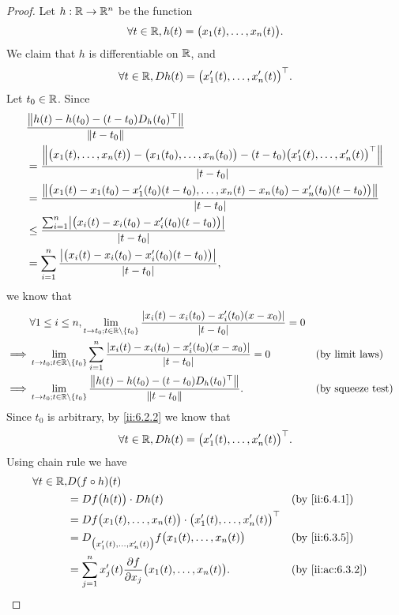 \begin{proof}
  Let \(h : \R \to \R^n\) be the function
  \[
    \forall t \in \R, h(t) = \big(x_1(t), \dots, x_n(t)\big).
  \]
  We claim that \(h\) is differentiable on \(\R\), and
  \[
    \forall t \in \R, D h(t) = \big(x_1'(t), \dots, x_n'(t)\big)^\top.
  \]
  Let \(t_0 \in \R\).
  Since
  \begin{align*}
     & \dfrac{\norm*{h(t) - h(t_0) - (t - t_0) D_h(t_0)^\top}}{\norm*{t - t_0}}                                                                                  \\
     & = \dfrac{\norm*{\big(x_1(t), \dots, x_n(t)\big) - \big(x_1(t_0), \dots, x_n(t_0)\big) - (t - t_0) \big(x_1'(t), \dots, x_n'(t)\big)^\top}}{\abs{t - t_0}} \\
     & = \dfrac{\norm*{\big(x_1(t) - x_1(t_0) - x_1'(t_0)(t - t_0), \dots, x_n(t) - x_n(t_0) - x_n'(t_0)(t - t_0)\big)}}{\abs{t - t_0}}                          \\
     & \leq \dfrac{\sum_{i = 1}^n \abs{\big(x_i(t) - x_i(t_0) - x_i'(t_0)(t - t_0)\big)}}{\abs{t - t_0}}                                                         \\
     & = \sum_{i = 1}^n \dfrac{\abs{\big(x_i(t) - x_i(t_0) - x_i'(t_0)(t - t_0)\big)}}{\abs{t - t_0}},
  \end{align*}
  we know that
  \begin{align*}
             & \forall 1 \leq i \leq n, \lim_{t \to t_0 ; t \in \R \setminus \set{t_0}} \dfrac{\abs{x_i(t) - x_i(t_0) - x_i'(t_0)(x - x_0)}}{\abs{t - t_0}} = 0                               \\
    \implies & \lim_{t \to t_0 ; t \in \R \setminus \set{t_0}} \sum_{i = 1}^n \dfrac{\abs{x_i(t) - x_i(t_0) - x_i'(t_0)(x - x_0)}}{\abs{t - t_0}} = 0           &  & \text{(by limit laws)}   \\
    \implies & \lim_{t \to t_0 ; t \in \R \setminus \set{t_0}} \dfrac{\norm*{h(t) - h(t_0) - (t - t_0) D_h(t_0)^\top}}{\norm*{t - t_0}}.                        &  & \text{(by squeeze test)}
  \end{align*}
  Since \(t_0\) is arbitrary, by \cref{ii:6.2.2} we know that
  \[
    \forall t \in \R, D h(t) = \big(x_1'(t), \dots, x_n'(t)\big)^\top.
  \]
  Using chain rule we have
  \begin{align*}
    \forall t \in \R, & D (f \circ h)(t)                                                                                             \\
                      & = D f\big(h(t)\big) \cdot D h(t)                                                          &  & \by{ii:6.4.1}    \\
                      & = D f\big(x_1(t), \dots, x_n(t)\big) \cdot \big(x_1'(t), \dots, x_n'(t)\big)^\top                            \\
                      & = D_{\big(x_1'(t), \dots, x_n'(t)\big)} f\big(x_1(t), \dots, x_n(t)\big)                  &  & \by{ii:6.3.5}    \\
                      & = \sum_{j = 1}^n x_j'(t) \dfrac{\partial f}{\partial x_j}\big(x_1(t), \dots, x_n(t)\big). &  & \by{ii:ac:6.3.2}
  \end{align*}
\end{proof}

